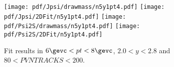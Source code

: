 \begin{figure}[H]
\begin{center}
\texttt{[image: pdf/Jpsi/drawmass/n5y1pt4.pdf]}
\texttt{[image: pdf/Jpsi/2DFit/n5y1pt4.pdf]}
\vspace*{-0.5cm}
\texttt{[image: pdf/Psi2S/drawmass/n5y1pt4.pdf]}
\texttt{[image: pdf/Psi2S/2DFit/n5y1pt4.pdf]}
\vspace*{-0.5cm}
\end{center}
\caption{Fit results in $6\gevc<pt<8\gevc$, $2.0<y<2.8$ and $80<PVNTRACKS<200$.}
\label{Fitn5y1pt4}
\end{figure}
